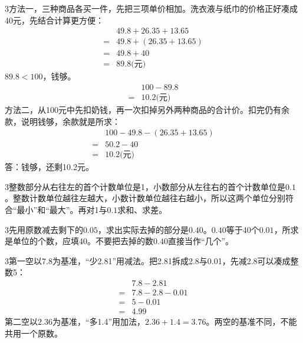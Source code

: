 \documentclass[multi=snippet,border={5bp 20bp 5bp 5bp}]{standalone}
\newenvironment{snippet}[3]{\begin{minipage}{#1bp}\color{answerred}\fontsize{#2}{#3}\selectfont\raggedright}{\end{minipage}}
\begin{document}
\begin{snippet}{505}{11.5}{14}\begin{multicols}{3}\raggedcolumns 方法一，三种商品各买一件，先把三项单价相加。洗衣液与纸巾的价格正好凑成40元，先结合计算更方便：\[\begin{aligned}&49.8+26.35+13.65\\={}&49.8+(26.35+13.65)\\={}&49.8+40\\={}&89.8\text{(元)}\end{aligned}\]\(89.8<100\)\allowbreak ，钱够。\[\begin{aligned}&100-89.8\\={}&10.2\text{(元)}\end{aligned}\]方法二，从100元中先扣奶钱，再一次扣掉另外两种商品的合计价。扣完仍有余款，说明钱够，余款就是所求：\[\begin{aligned}&100-49.8-(26.35+13.65)\\={}&50.2-40\\={}&10.2\text{(元)}\end{aligned}\]答：钱够，还剩10.2元。\end{multicols}\end{snippet}
\begin{snippet}{505}{11.5}{14}\begin{multicols}{3}\raggedcolumns 整数部分从右往左的首个计数单位是1，小数部分从左往右的首个计数单位是\(0.1\)\allowbreak 。整数计数单位越往左越大，小数计数单位越往右越小，所以这两个单位分别符合“最小”和“最大”。再对1与\(0.1\)\allowbreak 求和、求差。\end{multicols}\end{snippet}
\begin{snippet}{505}{11.5}{14}\begin{multicols}{3}\raggedcolumns 先用原数减去剩下的\(0.05\)\allowbreak ，求出实际去掉的部分是\(0.40\)\allowbreak 。\(0.40\)\allowbreak 等于40个\(0.01\)\allowbreak ，所求是单位的个数，应填40。不要把去掉的数\(0.40\)\allowbreak 直接当作“几个”。\end{multicols}\end{snippet}
\begin{snippet}{505}{11.5}{14}\begin{multicols}{3}\raggedcolumns 第一空以7.8为基准，“少2.81”用减法。把2.81拆成2.8与0.01，先减2.8可以凑成整数5：\[\begin{aligned}&7.8-2.81\\={}&7.8-2.8-0.01\\={}&5-0.01\\={}&4.99\end{aligned}\]第二空以2.36为基准，“多1.4”用加法，\(2.36+1.4=3.76\)\allowbreak 。两空的基准不同，不能共用一个原数。\end{multicols}\end{snippet}
\end{document}
